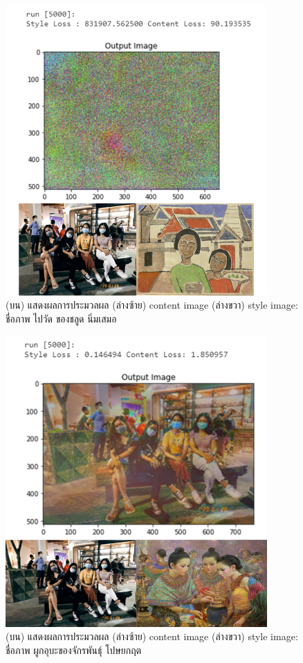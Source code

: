 \documentclass[12pt,oneside,openright,a4paper]{cpe-thai-project}
\begin{document}
\begin{figure}[!h]
  \centering
  \includegraphics[width=10cm]{./image/result1.png}
  \caption{(บน) แสดงผลการประมวลผล (ล่างซ้าย) content image (ล่างขวา) style image: ชื่อภาพ ไปวัด ของชลูด นิ่มเสมอ}
  \label{fig:result1}
\end{figure}

\newpage
\begin{figure}[!h]
  \centering
  \includegraphics[width=10cm]{./image/result2.png}
  \caption{(บน) แสดงผลการประมวลผล (ล่างซ้าย) content image (ล่างขวา) style image: ชื่อภาพ ผูกอุบะของจักรพันธุ์ โปษยกฤต}
  \label{fig:result2}
\end{figure}
\end{document}
